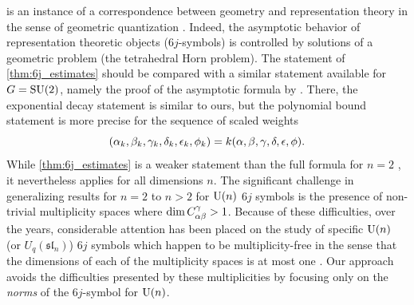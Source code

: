 \documentclass[notitlepage, 11pt, letterpaper]{amsart}
\begin{document}
 is an instance of a correspondence between geometry and representation theory in the sense of geometric quantization \cite{roberts2002asymptotics,guillemin1982geometric,kirillov2004lectures}.
Indeed, the asymptotic behavior of representation theoretic objects ($6j$-symbols) is controlled by solutions of a geometric problem (the tetrahedral Horn problem).
The statement of \cref{thm:6j_estimates} should be compared with a similar statement available for $G=\operatorname{SU}(2)$, namely the proof of the \citeauthor{ponzano1968semiclassical} asymptotic formula \cite{ponzano1968semiclassical} by \citeauthor{roberts1999classical} \cite{roberts1999classical}.
There, the exponential decay statement is similar to ours, but the polynomial bound statement is more precise for the sequence of scaled weights
\begin{equation}
    (\alpha_k, \beta_k, \gamma_k, \delta_k, \epsilon_k, \phi_k) = k (\alpha, \beta, \gamma, \delta, \epsilon, \phi).
\end{equation}
While \cref{thm:6j_estimates} is a weaker statement than the full \citeauthor{ponzano1968semiclassical} formula for $n=2$ \cite{ponzano1968semiclassical,roberts1999classical}, it nevertheless applies for all dimensions $n$.
The significant challenge in generalizing results for $n=2$ to $n > 2$ for $\operatorname{U}(n)$ $6j$ symbols is the presence of non-trivial multiplicity spaces where $\dim C^{\gamma}_{\alpha \beta} > 1$.
Because of these difficulties, over the years, considerable attention has been placed on the study of specific $\operatorname{U}(n)$ (or $U_q(\mathfrak{sl}_n)$) $6j$ symbols which happen to be multiplicity-free in the sense that the dimensions of each of the multiplicity spaces is at most one \cite{nawata2013multiplicity, alekseev2020multiplicity, alcock2023wigner, coquereaux2023integer}.
Our approach avoids the difficulties presented by these multiplicities by focusing only on the \textit{norms} of the $6j$-symbol for $\operatorname{U}(n)$.
\end{document}
